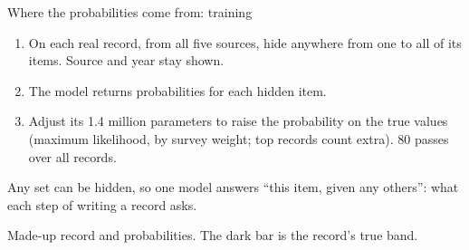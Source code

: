 \documentclass[11pt,aspectratio=169]{beamer}
\newcommand{\slidenote}[1]{\par\vfill{\scriptsize\color{yalegrey}#1}}
\begin{document}
\begin{frame}{Where the probabilities come from: training}
  \vspace{0.2em}
  \raggedright\small
  \begin{enumerate}\setlength{\itemsep}{1pt}
    \item On each real record, from all five sources, hide anywhere from one to all of its items.
          Source and year stay shown.
    \item The model returns probabilities for each hidden item.
    \item Adjust its 1.4 million parameters to raise the probability on the true values
          (maximum likelihood, by survey weight; top records count extra). 80 passes over all records.
  \end{enumerate}
  \vspace{0.2em}
  Any set can be hidden, so one model answers ``this item, given any others'': what each
  step of writing a record asks.
  \slidenote{Made-up record and probabilities. The dark bar is the record's true band.}
\end{frame}
\end{document}
